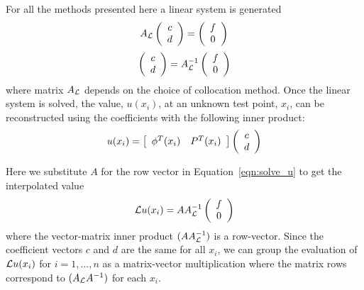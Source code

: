 \documentclass{report}
\begin{document}
{%
For all the methods presented here a linear system is generated  
$$
A_{\mathcal{L}}  \left( \begin{array}{cc}  c \\ d  \end{array} \right)  =  \left( \begin{array}{cc}  f \\ 0  \end{array} \right) 
$$
\begin{equation}
  \left( \begin{array}{cc}  c \\ d  \end{array} \right) = A^{-1}_{\mathcal{L}}  \left( \begin{array}{cc}  f \\ 0  \end{array} \right)
  \label{eqn:solve_coeffs}
 \end{equation}
 where matrix $A_{\mathcal{L}}$ depends on the choice of collocation method. 
Once the linear system is solved, the value, $u(x_i)$, at an unknown test point, $x_i$, can be reconstructed using the coefficients with the following inner product: 
\begin{eqnarray}
u(x_i) = 
\left[ \begin{array}{c c} 
       \phi^T(x_i) &  P^T(x_i)
	\end{array} \right]
	  \left( \begin{array}{cc}  c \\ d  \end{array} \right) 
	\label{eqn:solve_u}
\end{eqnarray}

Here we substitute $A$ for the row vector in Equation~\ref{eqn:solve_u} to get the interpolated value
\begin{eqnarray}
\mathcal{L}u(x_i) = A A^{-1}_{\mathcal{L}} \left( \begin{array}{cc}  f \\ 0  \end{array} \right)
	\label{eqn:solve_rbf}
\end{eqnarray}
where the vector-matrix inner product $(A A^{-1}_{\mathcal{L}})$ is a row-vector. Since the coefficient vectors ${c}$ and ${d}$ are the same for all $x_i$, we can group the evaluation of $\mathcal{L}u(x_i)$ for $i=1,...,n$ as a matrix-vector multiplication where the matrix rows correspond to $(A_{\mathcal{L}} A^{-1})$ for each $x_i$. 


}
\end{document}

